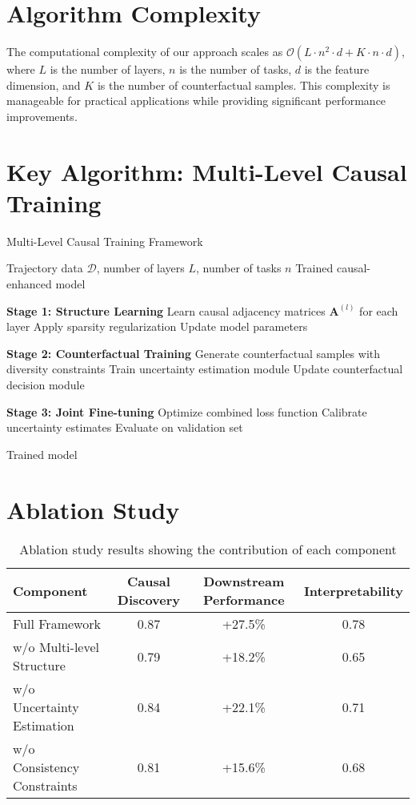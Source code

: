 \documentclass[12pt]{article}
\begin{document}
\section{Algorithm Complexity}

The computational complexity of our approach scales as $\mathcal{O}(L \cdot n^2 \cdot d + K \cdot n \cdot d)$, where $L$ is the number of layers, $n$ is the number of tasks, $d$ is the feature dimension, and $K$ is the number of counterfactual samples. This complexity is manageable for practical applications while providing significant performance improvements.

\section{Key Algorithm: Multi-Level Causal Training}

\begin{algorithm}[H]
\caption{Multi-Level Causal Training Framework}
\begin{algorithmic}[1]
\REQUIRE Trajectory data $\mathcal{D}$, number of layers $L$, number of tasks $n$
\ENSURE Trained causal-enhanced model

\STATE \textbf{Stage 1: Structure Learning}
    \STATE Learn causal adjacency matrices $\mathbf{A}^{(l)}$ for each layer
    \STATE Apply sparsity regularization
    \STATE Update model parameters
\ENDFOR

\STATE \textbf{Stage 2: Counterfactual Training}          
    \STATE Generate counterfactual samples with diversity constraints
    \STATE Train uncertainty estimation module
    \STATE Update counterfactual decision module
\ENDFOR

\STATE \textbf{Stage 3: Joint Fine-tuning}
    \STATE Optimize combined loss function
    \STATE Calibrate uncertainty estimates
    \STATE Evaluate on validation set
\ENDFOR

\RETURN Trained model
\end{algorithmic}
\end{algorithm}

\section{Ablation Study}

\begin{table}[h]
\centering
\begin{tabular}{|l|c|c|c|}
\hline
Component & Causal Discovery & Downstream Performance & Interpretability \\
\hline
Full Framework & 0.87 & +27.5\% & 0.78 \\
w/o Multi-level Structure & 0.79 & +18.2\% & 0.65 \\
w/o Uncertainty Estimation & 0.84 & +22.1\% & 0.71 \\
w/o Consistency Constraints & 0.81 & +15.6\% & 0.68 \\
\hline
\end{tabular}
\caption{Ablation study results showing the contribution of each component}
\end{table}
\end{document}
